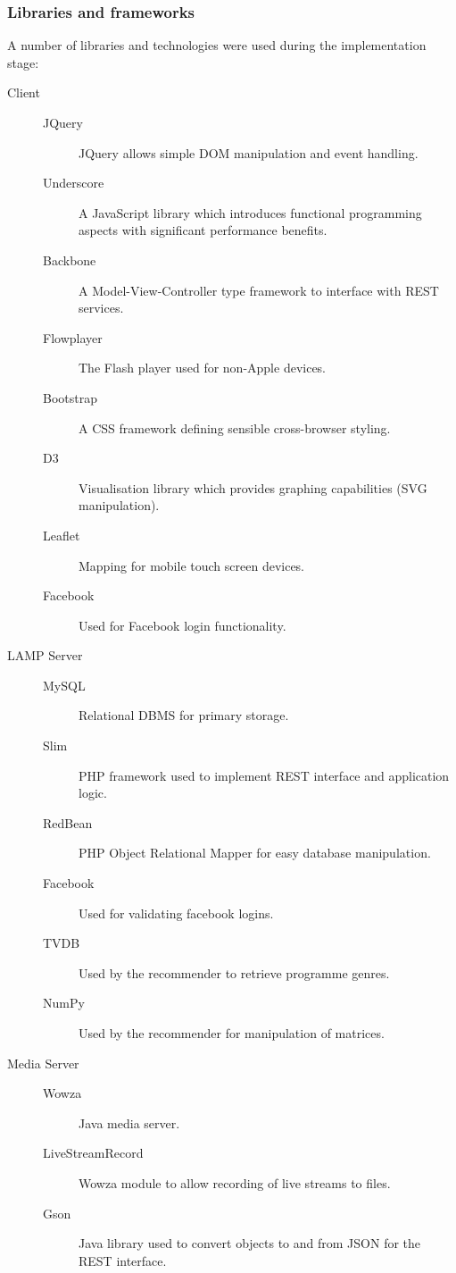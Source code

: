 \subsubsection{Libraries and frameworks}

A number of libraries and technologies were used during the implementation stage:

\begin{description}
	\item[Client] \hfill
		\begin{description}
			\item[JQuery] JQuery allows simple DOM manipulation and event handling.
			\item[Underscore] A JavaScript library which introduces functional programming aspects with significant performance benefits.
			\item[Backbone] A Model-View-Controller type framework to interface with REST services.
			\item[Flowplayer] The Flash player used for non-Apple devices.
			\item[Bootstrap] A CSS framework defining sensible cross-browser styling.
			\item[D3] Visualisation library which provides graphing capabilities (SVG manipulation).
			\item[Leaflet] Mapping for mobile touch screen devices.
			\item[Facebook] Used for Facebook login functionality.
		\end{description}
	\item[LAMP Server] \hfill
		\begin{description}
			\item[MySQL] Relational DBMS for primary storage.
			\item[Slim] PHP framework used to implement REST interface and application logic.
			\item[RedBean] PHP Object Relational Mapper for easy database manipulation.
			\item[Facebook] Used for validating facebook logins.
			\item[TVDB] Used by the recommender to retrieve programme genres.
			\item[NumPy] Used by the recommender for manipulation of matrices.
		\end{description}
	\item[Media Server] \hfill
		\begin{description}
			\item[Wowza] Java media server.
			\item[LiveStreamRecord] Wowza module to allow recording of live streams to files.
			\item[Gson] Java library used to convert objects to and from JSON for the REST interface.
		\end{description}
\end{description}

